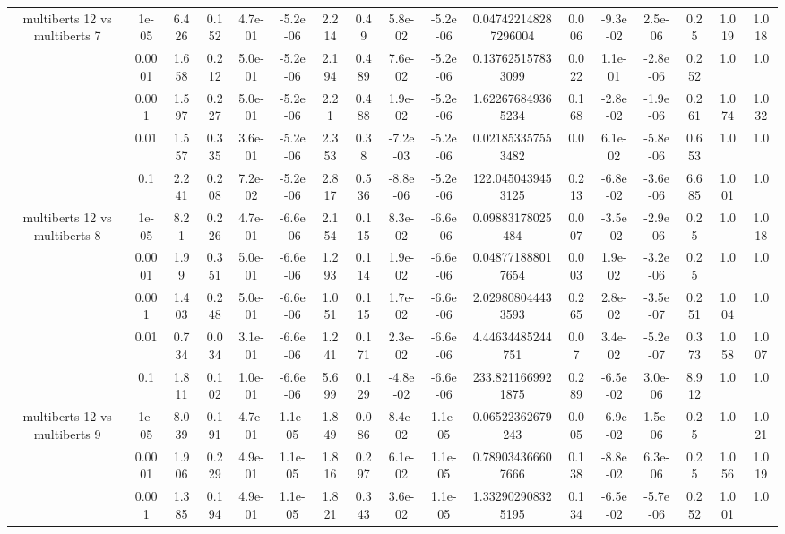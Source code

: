 \begin{tabular}{|c|c|c|c|c|c|c|c|c|c|c|c|c|c|c|c|c|}
\hline
\multirow{5}{*}{multiberts 12 vs multiberts 7} & 1e-05 & 6.426 & 0.152 & 4.7e-01 & -5.2e-06 & 2.214 & 0.49 & 5.8e-02 & -5.2e-06 & 0.047422148287296004 & 0.006 & -9.3e-02 & 2.5e-06 & 0.25 & 1.019 & 1.018 \\
 & 0.0001 & 1.658 & 0.212 & 5.0e-01 & -5.2e-06 & 2.194 & 0.489 & 7.6e-02 & -5.2e-06 & 0.137625157833099 & 0.022 & 1.1e-01 & -2.8e-06 & 0.252 & 1.0 & 1.0 \\
 & 0.001 & 1.597 & 0.227 & 5.0e-01 & -5.2e-06 & 2.21 & 0.488 & 1.9e-02 & -5.2e-06 & 1.622676849365234 & 0.168 & -2.8e-02 & -1.9e-06 & 0.261 & 1.074 & 1.032 \\
 & 0.01 & 1.557 & 0.335 & 3.6e-01 & -5.2e-06 & 2.353 & 0.38 & -7.2e-03 & -5.2e-06 & 0.021853357553482 & 0.0 & 6.1e-02 & -5.8e-06 & 0.653 & 1.0 & 1.0 \\
 & 0.1 & 2.241 & 0.208 & 7.2e-02 & -5.2e-06 & 2.817 & 0.536 & -8.8e-06 & -5.2e-06 & 122.0450439453125 & 0.213 & -6.8e-02 & -3.6e-06 & 6.685 & 1.001 & 1.0 \\
\hline
\multirow{5}{*}{multiberts 12 vs multiberts 8} & 1e-05 & 8.21 & 0.226 & 4.7e-01 & -6.6e-06 & 2.154 & 0.115 & 8.3e-02 & -6.6e-06 & 0.09883178025484 & 0.007 & -3.5e-02 & -2.9e-06 & 0.25 & 1.0 & 1.018 \\
 & 0.0001 & 1.99 & 0.351 & 5.0e-01 & -6.6e-06 & 1.293 & 0.114 & 1.9e-02 & -6.6e-06 & 0.048771888017654 & 0.003 & 1.9e-02 & -3.2e-06 & 0.25 & 1.0 & 1.0 \\
 & 0.001 & 1.403 & 0.248 & 5.0e-01 & -6.6e-06 & 1.051 & 0.115 & 1.7e-02 & -6.6e-06 & 2.029808044433593 & 0.265 & 2.8e-02 & -3.5e-07 & 0.251 & 1.004 & 1.0 \\
 & 0.01 & 0.734 & 0.034 & 3.1e-01 & -6.6e-06 & 1.241 & 0.171 & 2.3e-02 & -6.6e-06 & 4.44634485244751 & 0.07 & 3.4e-02 & -5.2e-07 & 0.373 & 1.058 & 1.007 \\
 & 0.1 & 1.811 & 0.102 & 1.0e-01 & -6.6e-06 & 5.699 & 0.129 & -4.8e-02 & -6.6e-06 & 233.8211669921875 & 0.289 & -6.5e-02 & 3.0e-06 & 8.912 & 1.0 & 1.0 \\
\hline
\multirow{5}{*}{multiberts 12 vs multiberts 9} & 1e-05 & 8.039 & 0.191 & 4.7e-01 & 1.1e-05 & 1.849 & 0.086 & 8.4e-02 & 1.1e-05 & 0.06522362679243 & 0.005 & -6.9e-02 & 1.5e-06 & 0.25 & 1.0 & 1.021 \\
 & 0.0001 & 1.906 & 0.229 & 4.9e-01 & 1.1e-05 & 1.816 & 0.297 & 6.1e-02 & 1.1e-05 & 0.789034366607666 & 0.138 & -8.8e-02 & 6.3e-06 & 0.25 & 1.056 & 1.019 \\
 & 0.001 & 1.385 & 0.194 & 4.9e-01 & 1.1e-05 & 1.821 & 0.343 & 3.6e-02 & 1.1e-05 & 1.332902908325195 & 0.134 & -6.5e-02 & -5.7e-06 & 0.252 & 1.001 & 1.0 \\

\end{tabular}
